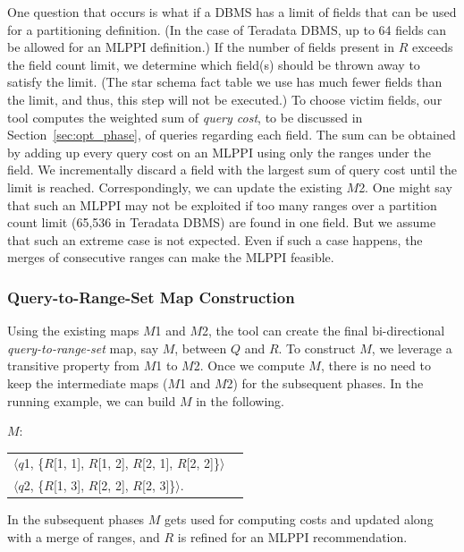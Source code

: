 \documentclass[runningheads]{comsis2}
\begin{document}
One question that occurs is what if a DBMS has 
a limit of fields that can be used for a partitioning definition. 
(In the case of Teradata DBMS, up to 64 fields can be allowed for 
an MLPPI definition.)
If the number of fields present in $R$ exceeds the field count limit, 
we determine which field(s) should be thrown away to satisfy the limit. 
(The star schema fact table we use has much fewer fields than the limit, 
and thus, this step will not be executed.)
To choose victim fields, our tool computes the weighted sum of 
{\em query cost}, to be discussed in Section~\ref{sec:opt_phase}, 
of queries regarding each field. 
The sum can be obtained by adding up every query cost on an MLPPI using 
only the ranges under the field. 
We incrementally discard a field with the largest sum of query cost 
until the limit is reached. 
Correspondingly, we can update the existing $M$2. 
One might say that such an MLPPI may not be exploited if too many ranges 
over a partition count limit (65,536 in Teradata DBMS) are found in one field.
But we assume that such an extreme case is not expected. Even if 
such a case happens, the merges of consecutive ranges can make the MLPPI feasible. 

\subsubsection{Query-to-Range-Set Map Construction}

Using the existing maps $M$1 and $M$2, 
the tool can create the final bi-directional {\em query-to-range-set} map, say $M$, 
between $Q$ and $R$. 
To construct $M$, we leverage a transitive property from $M$1 to $M$2.
Once we compute $M$, there is no need to keep 
the intermediate maps ($M$1 and $M$2) for the subsequent phases. 
In the running example, we can build $M$ in the following. 

\pagebreak

{\it $M$}:
\begin{center}
\begin{tabular}{ll} 
$\langle${$q$1}, \{$R$[1, 1], $R$[1, 2], $R$[2, 1], $R$[2, 2]\}$\rangle$ \\
$\langle${$q$2}, \{$R$[1, 3], $R$[2, 2], $R$[2, 3]\}$\rangle$.
\end{tabular}
\end{center} 

\noindent In the subsequent phases $M$ gets used for computing costs and updated 
along with a merge of ranges, and $R$ is refined for an MLPPI recommendation. 
\end{document}
